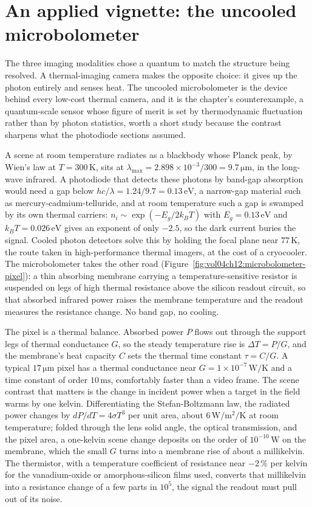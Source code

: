 \section{An applied vignette: the uncooled microbolometer}

The three imaging modalities chose a quantum to match the structure being
resolved. A thermal-imaging camera makes the opposite choice: it gives up
the photon entirely and senses heat. The uncooled microbolometer is the
device behind every low-cost thermal camera, and it is the chapter's
counterexample, a quantum-scale sensor whose figure of merit is set by
thermodynamic fluctuation rather than by photon statistics, worth a short
study because the contrast sharpens what the photodiode sections assumed.

A scene at room temperature radiates as a blackbody whose Planck peak,
by Wien's law at $T = 300\,\si{\kelvin}$, sits at $\lambda_{\max} =
2.898\times 10^{-3}/300 = 9.7\,\si{\micro\meter}$, in the long-wave
infrared. A photodiode that detects these photons by band-gap absorption
would need a gap below $hc/\lambda = 1.24/9.7 = 0.13\,\si{\electronvolt}$,
a narrow-gap material such as mercury-cadmium-telluride, and at room
temperature such a gap is swamped by its own thermal carriers: $n_i \sim
\exp(-E_g/2k_B T)$ with $E_g = 0.13\,\si{\electronvolt}$ and $k_B T =
0.026\,\si{\electronvolt}$ gives an exponent of only $-2.5$, so the dark
current buries the signal. Cooled photon detectors solve this by holding
the focal plane near $77\,\si{\kelvin}$, the route taken in
high-performance thermal imagers, at the cost of a cryocooler. The
microbolometer takes the other road
(Figure~\ref{fig:vol04ch12:microbolometer-pixel}): a thin absorbing
membrane carrying a temperature-sensitive resistor is suspended on legs of
high thermal resistance above the silicon readout circuit, so that
absorbed infrared power raises the membrane temperature and the readout
measures the resistance change. No band gap, no cooling.

The pixel is a thermal balance. Absorbed power $P$ flows out through the
support legs of thermal conductance $G$, so the steady temperature rise is
$\Delta T = P/G$, and the membrane's heat capacity $C$ sets the thermal
time constant $\tau = C/G$. A typical $17\,\si{\micro\meter}$ pixel has a
thermal conductance near $G = 1\times 10^{-7}\,\si{\watt\per\kelvin}$ and a
time constant of order $10\,\si{\milli\second}$, comfortably faster than a
video frame. The scene contrast that matters is the change in incident
power when a target in the field warms by one kelvin. Differentiating the
Stefan-Boltzmann law, the radiated power changes by $dP/dT = 4\sigma T^{3}$
per unit area, about $6\,\si{\watt\per\meter\squared\per\kelvin}$ at room
temperature; folded through the lens solid angle, the optical
transmission, and the pixel area, a one-kelvin scene change deposits on the
order of $10^{-10}\,\si{\watt}$ on the membrane, which the small $G$ turns
into a membrane rise of about a millikelvin. The thermistor, with a
temperature coefficient of resistance near $-2\,\%$ per kelvin for the
vanadium-oxide or amorphous-silicon films used, converts that millikelvin
into a resistance change of a few parts in $10^{5}$, the signal the readout
must pull out of its noise.

